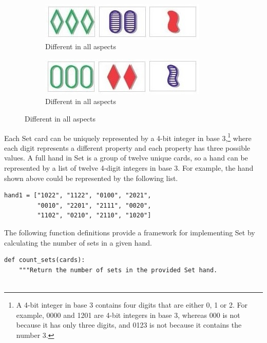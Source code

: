 \begin{problem}
\begin{figure}[H]
\begin{subfigure}{.47\textwidth}
\end{subfigure}
\\
\begin{subfigure}{.47\textwidth}
    \centering
    \includegraphics[width=\linewidth]{figures/set4.jpg}
    \caption{Different in all aspects}
\end{subfigure}
%
\begin{subfigure}{.47\textwidth}
    \centering
    \includegraphics[width=\linewidth]{figures/set5.jpg}
    \caption{Different in all aspects}
\end{subfigure}
\end{figure}

Each Set card can be uniquely represented by a 4-bit integer in base 3,\footnote{A 4-bit integer in base 3 contains four digits that are either 0, 1 or 2. For example, 0000 and 1201 are 4-bit integers in base 3, whereas 000 is not because it has only three digits, and 0123 is not because it contains the number 3.} where each digit represents a different property and each property has three possible values.
A full hand in Set is a group of twelve unique cards, so a hand can be represented by a list of twelve 4-digit integers in base 3.
For example, the hand shown above could be represented by the following list.

\begin{lstlisting}
hand1 = ["1022", "1122", "0100", "2021",
         "0010", "2201", "2111", "0020",
         "1102", "0210", "2110", "1020"]
\end{lstlisting}

The following function definitions provide a framework for implementing Set by calculating the number of sets in a given hand. %

\newpage

\begin{lstlisting}
def count_sets(cards):
    """Return the number of sets in the provided Set hand.


\end{lstlisting}
\end{problem}
